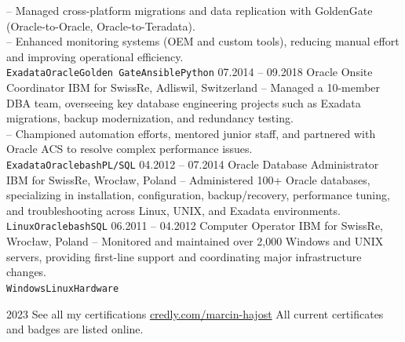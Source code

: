 \documentclass[9pt]{developercv} %
\begin{document}
\begin{entrylist}
{-- Managed cross-platform migrations and data replication with GoldenGate (Oracle-to-Oracle, Oracle-to-Teradata).\\
-- Enhanced monitoring systems (OEM and custom tools), reducing manual effort and improving operational efficiency.\\
\texttt{Exadata}\slashsep\texttt{Oracle}\slashsep\texttt{Golden Gate}\slashsep\texttt{Ansible}\slashsep\texttt{Python}}
\entry
{07.2014 -- 09.2018}
{Oracle Onsite Coordinator}
{IBM for SwissRe, Adliswil, Switzerland}
{-- Managed a 10-member DBA team, overseeing key database engineering projects such as Exadata migrations, backup modernization, and redundancy testing.\\
-- Championed automation efforts, mentored junior staff, and partnered with Oracle ACS to resolve complex performance issues.\\
\texttt{Exadata}\slashsep\texttt{Oracle}\slashsep\texttt{bash}\slashsep\texttt{PL/SQL}}
\entry
{04.2012 -- 07.2014}
{Oracle Database Administrator}
{IBM for SwissRe, Wrocław, Poland}
{-- Administered 100+ Oracle databases, specializing in installation, configuration, backup/recovery, performance tuning, and troubleshooting across Linux, UNIX, and Exadata environments.\\
\texttt{Linux}\slashsep\texttt{Oracle}\slashsep\texttt{bash}\slashsep\texttt{SQL}}
\entry
{06.2011 -- 04.2012}
{Computer Operator}
{IBM for SwissRe, Wrocław, Poland}
{-- Monitored and maintained over 2,000 Windows and UNIX servers, providing first-line support and coordinating major infrastructure changes.\\
\texttt{Windows}\slashsep\texttt{Linux}\slashsep\texttt{Hardware}}
\end{entrylist}



\begin{entrylist}
\entry
{2023}
{See all my certifications}
{\href{https://www.credly.com/users/marcin-hajost.2da7c779}{credly.com/marcin-hajost}}
{All current certificates and badges are listed online.}
\end{entrylist}

\end{document}

